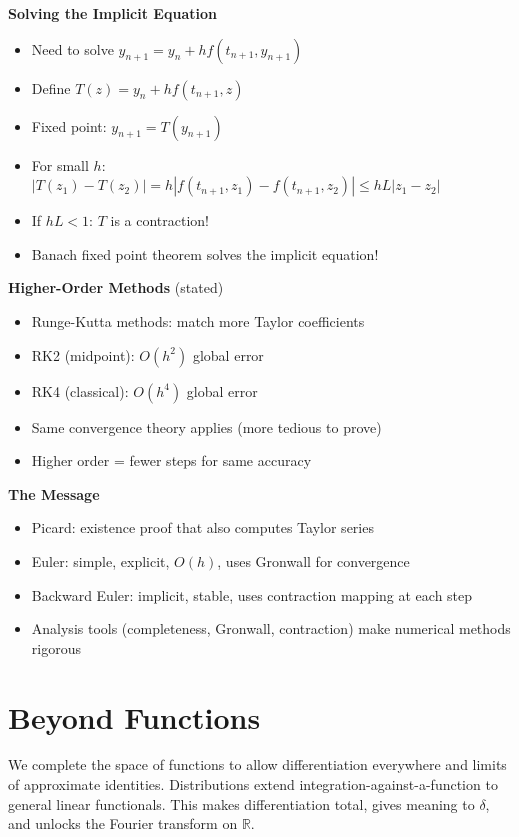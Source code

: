 \documentclass[
  10pt,
  letterpaper,
]{scrbook}
\providecommand{\tightlist}{%
  \setlength{\itemsep}{0pt}\setlength{\parskip}{0pt}}
\begin{document}
\textbf{Solving the Implicit Equation}

\begin{itemize}
\tightlist
\item
  Need to solve \(y_{n+1} = y_n + hf(t_{n+1}, y_{n+1})\)
\item
  Define \(T(z) = y_n + hf(t_{n+1}, z)\)
\item
  Fixed point: \(y_{n+1} = T(y_{n+1})\)
\item
  For small \(h\):
  \(|T(z_1) - T(z_2)| = h|f(t_{n+1}, z_1) - f(t_{n+1}, z_2)| \leq hL|z_1 - z_2|\)
\item
  If \(hL < 1\): \(T\) is a contraction!
\item
  Banach fixed point theorem solves the implicit equation!
\end{itemize}

\textbf{Higher-Order Methods} (stated)

\begin{itemize}
\tightlist
\item
  Runge-Kutta methods: match more Taylor coefficients
\item
  RK2 (midpoint): \(O(h^2)\) global error
\item
  RK4 (classical): \(O(h^4)\) global error
\item
  Same convergence theory applies (more tedious to prove)
\item
  Higher order = fewer steps for same accuracy
\end{itemize}

\textbf{The Message}

\begin{itemize}
\tightlist
\item
  Picard: existence proof that also computes Taylor series
\item
  Euler: simple, explicit, \(O(h)\), uses Gronwall for convergence
\item
  Backward Euler: implicit, stable, uses contraction mapping at each
  step
\item
  Analysis tools (completeness, Gronwall, contraction) make numerical
  methods rigorous
\end{itemize}

\chapter{Beyond Functions}\label{beyond-functions}

We complete the space of functions to allow differentiation everywhere
and limits of approximate identities. Distributions extend
integration-against-a-function to general linear functionals. This makes
differentiation total, gives meaning to \(\delta\), and unlocks the
Fourier transform on \(\mathbb{R}\).
\end{document}
